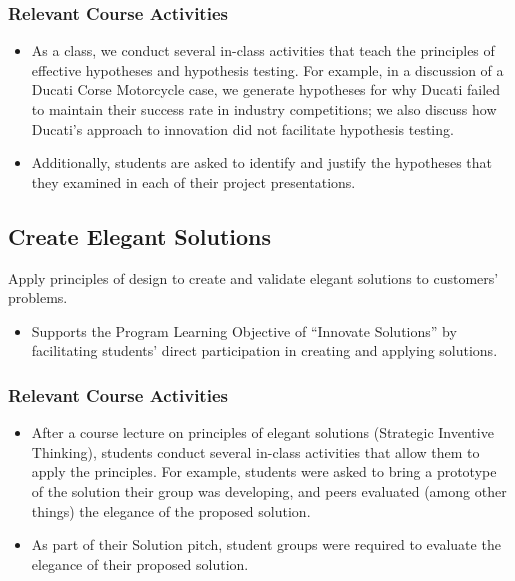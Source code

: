 \documentclass[11pt,article,oneside]{memoir}
\begin{document}
\subsubsection{Relevant Course
Activities}\label{relevant-course-activities-2}

\begin{itemize}
\tightlist
\item
  As a class, we conduct several in-class activities that teach the
  principles of effective hypotheses and hypothesis testing. For
  example, in a discussion of a Ducati Corse Motorcycle case, we
  generate hypotheses for why Ducati failed to maintain their success
  rate in industry competitions; we also discuss how Ducati's approach
  to innovation did not facilitate hypothesis testing.
\item
  Additionally, students are asked to identify and justify the
  hypotheses that they examined in each of their project presentations.
\end{itemize}

\subsection{Create Elegant Solutions}\label{create-elegant-solutions}

Apply principles of design to create and validate elegant solutions to
customers' problems.

\begin{itemize}
\tightlist
\item
  Supports the Program Learning Objective of \enquote{Innovate
  Solutions} by facilitating students' direct participation in creating
  and applying solutions.
\end{itemize}

\subsubsection{Relevant Course
Activities}\label{relevant-course-activities-3}

\begin{itemize}
\tightlist
\item
  After a course lecture on principles of elegant solutions (Strategic
  Inventive Thinking), students conduct several in-class activities that
  allow them to apply the principles. For example, students were asked
  to bring a prototype of the solution their group was developing, and
  peers evaluated (among other things) the elegance of the proposed
  solution.
\item
  As part of their Solution pitch, student groups were required to
  evaluate the elegance of their proposed solution.
\end{itemize}
\end{document}
